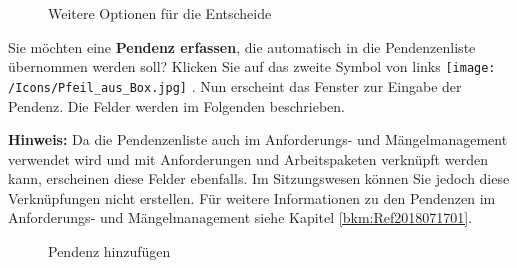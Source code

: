 \begin{figure}[H]
\caption{Weitere Optionen für die Entscheide}
\end{figure}

Sie möchten eine \textbf{Pendenz erfassen}, die automatisch in die Pendenzenliste übernommen werden soll? Klicken Sie auf das zweite Symbol von links \texttt{[image: /Icons/Pfeil\_aus\_Box.jpg]} . Nun erscheint das Fenster zur Eingabe der Pendenz. Die Felder werden im Folgenden beschrieben. 

\vspace{\baselineskip}

\textbf{Hinweis:} Da die Pendenzenliste auch im Anforderungs- und Mängelmanagement verwendet wird und mit Anforderungen und Arbeitspaketen verknüpft werden kann, erscheinen diese Felder ebenfalls. Im Sitzungswesen können Sie jedoch diese Verknüpfungen nicht erstellen. Für weitere Informationen zu den Pendenzen im Anforderungs- und Mängelmanagement siehe Kapitel \ref{bkm:Ref2018071701}.

\begin{figure}[H]
\caption{Pendenz hinzufügen}
\end{figure}

